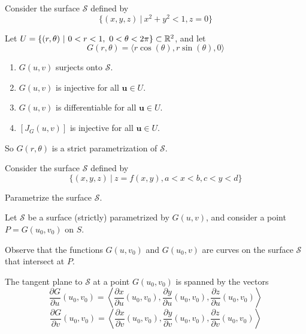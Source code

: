 \begin{example}
        Consider the surface $\mathcal{S}$ defined by $$\{(x,y,z) \ | \ x^2 + y^2 < 1, z=0\}$$ 
        
        Let $U = \{(r,\theta) \ | \ 0 < r < 1, \ 0 < \theta < 2\pi\} \subset \mathbb{R}^2$, and let $$G(r,\theta) = \langle r\cos(\theta), r\sin(\theta), 0 \rangle$$

\begin{enumerate}               
        \item $G(u,v)$ surjects onto $\mathcal{S}$.
        \item $G(u,v)$ is injective for all $\bm{u} \in U$.
        
        \item $G(u,v)$ is differentiable for all $\bm{u} \in U$.

        \item $[J_G(u,v)]$ is injective for all $\bm{u} \in U$.
    \end{enumerate}

    So $G(r,\theta)$ is a strict parametrization of $\mathcal{S}$.
        
    \end{example}

    \begin{example}
        Consider the surface $\mathcal{S}$ defined by $$\{(x,y,z) \ | \ z= f(x,y), a < x < b, c < y < d\}$$

        Parametrize the surface $\mathcal{S}$.
    \end{example}


\begin{remark}
    Let $\mathcal{S}$ be a surface (strictly) parametrized by $G(u,v)$, and consider a point $P = G(u_0,v_0)$ on $S$.
    
    \vspace{1em}
    
    Observe that the functions $G(u,v_0)$ and $G(u_0,v)$ are curves on the surface $\mathcal{S}$ that intersect at $P$.
    \end{remark}
    

\begin{theorem}
    The tangent plane to $\mathcal{S}$ at a point $G(u_0,v_0)$ is spanned by the vectors $$\frac{\partial G}{\partial u}(u_0,v_0) = \left\langle \frac{\partial x}{\partial u}(u_0,v_0), \frac{\partial y}{\partial u}(u_0,v_0), \frac{\partial z}{\partial u}(u_0,v_0) \right\rangle$$
    $$\frac{\partial G}{\partial v}(u_0,v_0) = \left\langle \frac{\partial x}{\partial v}(u_0,v_0), \frac{\partial y}{\partial v}(u_0,v_0), \frac{\partial z}{\partial v}(u_0,v_0) \right\rangle$$
    \end{theorem}
    
